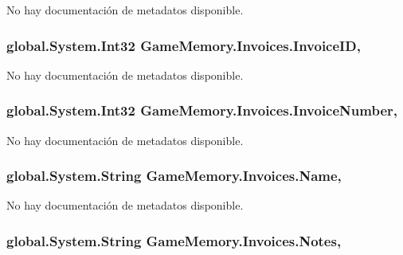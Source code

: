 No hay documentación de metadatos disponible. 

\hypertarget{class_game_memory_1_1_invoices_a5e354613497aec5c10ef302d9d9e7258}{
\subsubsection[{Invoice\-I\-D}]{\setlength{\rightskip}{0pt plus 5cm}global.\-System.\-Int32 Game\-Memory.\-Invoices.\-Invoice\-I\-D\hspace{0.3cm}{\ttfamily [get]}, {\ttfamily [set]}}}\label{class_game_memory_1_1_invoices_a5e354613497aec5c10ef302d9d9e7258}


No hay documentación de metadatos disponible. 

\hypertarget{class_game_memory_1_1_invoices_ae1338eba0dcd9ebfc1ae59ee289c9c15}{
\subsubsection[{Invoice\-Number}]{\setlength{\rightskip}{0pt plus 5cm}global.\-System.\-Int32 Game\-Memory.\-Invoices.\-Invoice\-Number\hspace{0.3cm}{\ttfamily [get]}, {\ttfamily [set]}}}\label{class_game_memory_1_1_invoices_ae1338eba0dcd9ebfc1ae59ee289c9c15}


No hay documentación de metadatos disponible. 

\hypertarget{class_game_memory_1_1_invoices_a82fa8e4d468479126d9f05e6590bd95f}{
\subsubsection[{Name}]{\setlength{\rightskip}{0pt plus 5cm}global.\-System.\-String Game\-Memory.\-Invoices.\-Name\hspace{0.3cm}{\ttfamily [get]}, {\ttfamily [set]}}}\label{class_game_memory_1_1_invoices_a82fa8e4d468479126d9f05e6590bd95f}


No hay documentación de metadatos disponible. 

\hypertarget{class_game_memory_1_1_invoices_a5e477e04fbcd9ad7185e8262af528be3}{
\subsubsection[{Notes}]{\setlength{\rightskip}{0pt plus 5cm}global.\-System.\-String Game\-Memory.\-Invoices.\-Notes\hspace{0.3cm}{\ttfamily [get]}, {\ttfamily [set]}}}\label{class_game_memory_1_1_invoices_a5e477e04fbcd9ad7185e8262af528be3}



